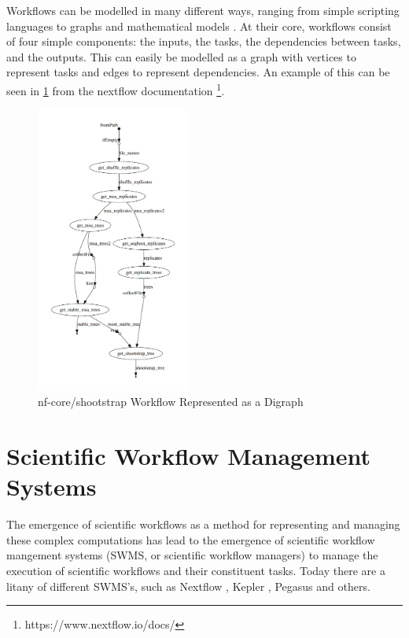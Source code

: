 Workflows can be modelled in many different ways, ranging from simple scripting languages to graphs and mathematical models \cite{Shields}. At their core, workflows consist of four simple components: the inputs, the tasks, the dependencies between tasks, and the outputs. This can easily be modelled as a graph with vertices to represent tasks and edges to represent dependencies. An example of this can be seen in \ref{fig:dag} from the nextflow documentation \footnote{https://www.nextflow.io/docs/}. 

\begin{figure}[hp]
    \centering
        \includegraphics[width=0.45\textwidth,height=0.675\textheight]{fig/dag.png}
        \caption{nf-core/shootstrap Workflow Represented as a Digraph}
        \label{fig:dag}
\end{figure}




\section{Scientific Workflow Management Systems}
\label{sec:management}

The emergence of scientific workflows as a method for representing and managing these complex computations has lead to the emergence of scientific workflow mangement systems (SWMS, or scientific workflow managers) to manage the execution of scientific workflows and their constituent tasks. Today there are a litany of different SWMS’s, such as Nextflow \cite{nextflow},  Kepler \cite{kepler},  Pegasus \cite{pegasus} and others.

